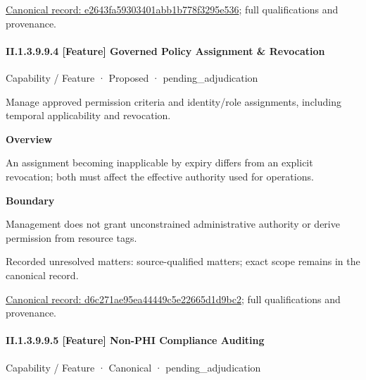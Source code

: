 {\footnotesize \href{../../../../../../../continuum/strategy/capability/feature/e2643fa59303401abb1b778f3295e536.md}{Canonical record: e2643fa59303401abb1b778f3295e536}; full qualifications and provenance.}\par
\paragraph*{II.1.3.9.9.4 [Feature] Governed Policy Assignment \& Revocation}
\label{navigation:II.1.3.9.9.4}

\label{element:d6c271ae95ea44449c5e22665d1d9bc2}
{\small Capability / Feature · Proposed · pending\_adjudication}\par

Manage approved permission criteria and identity/role assignments, including temporal applicability and revocation.



\textbf{Overview}



An assignment becoming inapplicable by expiry differs from an explicit revocation; both must affect the effective authority used for operations.



\textbf{Boundary}



Management does not grant unconstrained administrative authority or derive permission from resource tags.


{\small Recorded unresolved matters: source-qualified matters; exact scope remains in the canonical record.}\par
{\footnotesize \href{../../../../../../../continuum/strategy/capability/feature/d6c271ae95ea44449c5e22665d1d9bc2.md}{Canonical record: d6c271ae95ea44449c5e22665d1d9bc2}; full qualifications and provenance.}\par
\paragraph*{II.1.3.9.9.5 [Feature] Non-PHI Compliance Auditing}
\label{navigation:II.1.3.9.9.5}

\label{element:08e37326908a49988dfb787f68df840a}
{\small Capability / Feature · Canonical · pending\_adjudication}\par

